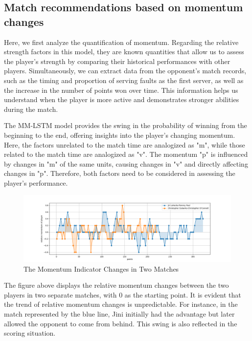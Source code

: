 \subsection{Match recommendations based on momentum changes}

Here, we first analyze the quantification of momentum. Regarding the relative strength factors in this model, they are known quantities that allow us to assess the player's strength by comparing their historical performances with other players. Simultaneously, we can extract data from the opponent's match records, such as the timing and proportion of serving faults as the first server, as well as the increase in the number of points won over time. This information helps us understand when the player is more active and demonstrates stronger abilities during the match.

The MM-LSTM model provides the swing in the probability of winning from the beginning to the end, offering insights into the player's changing momentum. Here, the factors unrelated to the match time are analogized as "m", while those related to the match time are analogized as "v". The momentum "p" is influenced by changes in "m" of the same units, causing changes in "v" and directly affecting changes in "p". Therefore, both factors need to be considered in assessing the player's performance.

\begin{figure}[htbp]
    \centering
    \includegraphics[width=1.1\textwidth]{figure/p_3_2_1.png}
    \caption{The Momentum Indicator Changes in Two Matches
    \textnormal{}}
\end{figure}



The figure above displays the relative momentum changes between the two players in two separate matches, with 0 as the starting point. It is evident that the trend of relative momentum changes is unpredictable. For instance, in the match represented by the blue line, Jini initially had the advantage but later allowed the opponent to come from behind. This swing is also reflected in the scoring situation.

